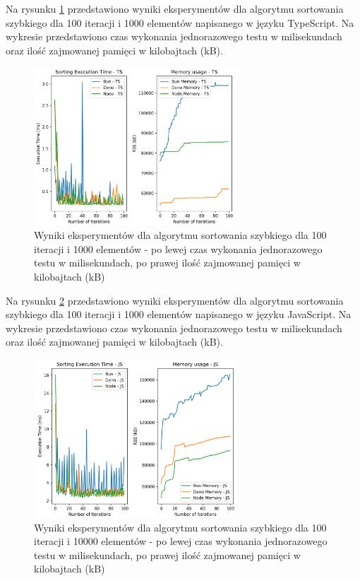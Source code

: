 Na rysunku \ref{fig:quick_sorting_e1_ts} przedstawiono wyniki eksperymentów dla algorytmu sortowania szybkiego dla 100 iteracji i 1000 elementów napisanego w języku TypeScript. Na wykresie przedstawiono czas wykonania jednorazowego testu w milisekundach oraz ilość zajmowanej pamięci w kilobajtach (kB).

\begin{figure}[H]
  \centering
  \includegraphics[width=0.68\textwidth]{Figures/sorting/sorting_quick_100_1000_ts.png}
  \caption{Wyniki eksperymentów dla algorytmu sortowania szybkiego dla 100 iteracji i 1000 elementów - po lewej czas wykonania jednorazowego testu w milisekundach, po prawej ilość zajmowanej pamięci w kilobajtach (kB)}
  \label{fig:quick_sorting_e1_ts}
\end{figure}

Na rysunku \ref{fig:quick_sorting_e2} przedstawiono wyniki eksperymentów dla algorytmu sortowania szybkiego dla 100 iteracji i 1000 elementów napisanego w języku JavaScript. Na wykresie przedstawiono czas wykonania jednorazowego testu w milisekundach oraz ilość zajmowanej pamięci w kilobajtach (kB).

\begin{figure}[H]
  \centering
  \includegraphics[width=0.68\textwidth]{Figures/sorting/sorting_quick_100_10000_js.png}
  \caption{Wyniki eksperymentów dla algorytmu sortowania szybkiego dla 100 iteracji i 10000 elementów - po lewej czas wykonania jednorazowego testu w milisekundach, po prawej ilość zajmowanej pamięci w kilobajtach (kB)}
  \label{fig:quick_sorting_e2}
\end{figure}

